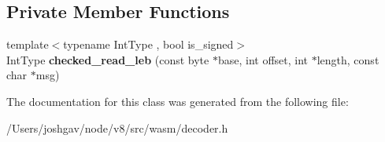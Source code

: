 \subsection*{Private Member Functions}
\begin{DoxyCompactItemize}
\item 
{\footnotesize template$<$typename Int\+Type , bool is\+\_\+signed$>$ }\\Int\+Type {\bfseries checked\+\_\+read\+\_\+leb} (const byte $\ast$base, int offset, int $\ast$length, const char $\ast$msg)\hypertarget{classv8_1_1internal_1_1wasm_1_1_decoder_aebd15ec76af37ab8276ac7729cf00fb1}{}\label{classv8_1_1internal_1_1wasm_1_1_decoder_aebd15ec76af37ab8276ac7729cf00fb1}

\end{DoxyCompactItemize}


The documentation for this class was generated from the following file\+:\begin{DoxyCompactItemize}
\item 
/\+Users/joshgav/node/v8/src/wasm/decoder.\+h\end{DoxyCompactItemize}
